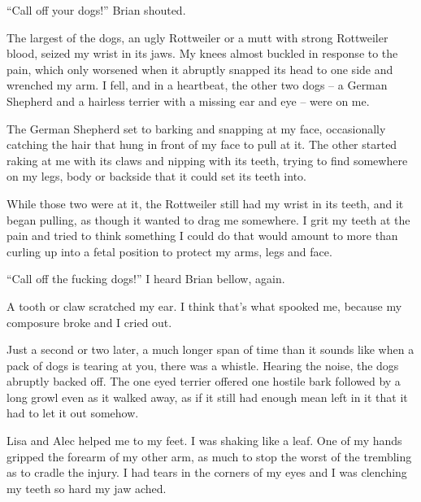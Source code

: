 





``Call off your dogs!'' Brian shouted.



The largest of the dogs, an ugly Rottweiler or a mutt with strong Rottweiler blood, seized my wrist in its jaws.  My knees almost buckled in response to the pain, which only worsened when it abruptly snapped its head to one side and wrenched my arm.  I fell, and in a heartbeat, the other two dogs – a German Shepherd and a hairless terrier with a missing ear and eye – were on me.



The German Shepherd set to barking and snapping at my face, occasionally catching the hair that hung in front of my face to pull at it.  The other started raking at me with its claws and nipping with its teeth, trying to find somewhere on my legs, body or backside that it could set its teeth into.



While those two were at it, the Rottweiler still had my wrist in its teeth, and it began pulling, as though it wanted to drag me somewhere.  I grit my teeth at the pain and tried to think something I could do that would amount to more than curling up into a fetal position to protect my arms, legs and face.



``Call off the fucking dogs!'' I heard Brian bellow, again.



A tooth or claw scratched my ear.  I think that's what spooked me, because my composure broke and I cried out.



Just a second or two later, a much longer span of time than it sounds like when a pack of dogs is tearing at you, there was a whistle.  Hearing the noise, the dogs abruptly backed off.  The one eyed terrier offered one hostile bark followed by a long growl even as it walked away, as if it still had enough mean left in it that it had to let it out somehow.



Lisa and Alec helped me to my feet.  I was shaking like a leaf.  One of my hands gripped the forearm of my other arm, as much to stop the worst of the trembling as to cradle the injury.  I had tears in the corners of my eyes and I was clenching my teeth so hard my jaw ached.



